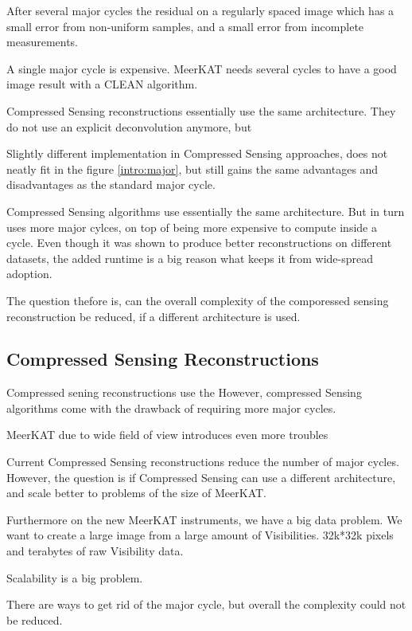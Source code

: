 After several major cycles the residual  on a regularly spaced image which has a small error from non-uniform samples, and a small error from incomplete measurements.

A single major cycle is expensive. MeerKAT needs several cycles to have a good image result with a CLEAN algorithm.


Compressed Sensing reconstructions essentially use the same architecture. They do not use an explicit deconvolution anymore, but 

Slightly different implementation in Compressed Sensing approaches, does not neatly fit in the figure \ref{intro:major}, but still gains the same advantages and disadvantages as the standard major cycle. 

Compressed Sensing algorithms use essentially the same architecture. But in turn uses more major cylces, on top of being more expensive to compute inside a cycle. Even though it was shown to produce better reconstructions on different datasets, the added runtime is a big reason what keeps it from wide-spread adoption. 

The question thefore is, can the overall complexity of the comporessed sensing reconstruction be reduced, if a different architecture is used.


\subsection{Compressed Sensing Reconstructions}
Compressed sening reconstructions use the 
 However, compressed Sensing algorithms come with the drawback of requiring more major cycles.

MeerKAT due to wide field of view introduces even more troubles

Current Compressed Sensing reconstructions reduce the number of major cycles. However, the question is if Compressed Sensing can use a different architecture, and scale better to problems of the size of MeerKAT.

Furthermore on the new MeerKAT instruments, we have a big data problem. We want to create a large image from a large amount of Visibilities. 32k*32k pixels and terabytes of raw Visibility data. 

Scalability is a big problem.

There are ways to get rid of the major cycle, but overall the complexity could not be reduced.









